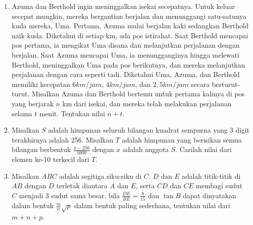 \documentclass{article}
\begin{document}
\begin{enumerate}
		\item
		Azuma dan Berthold ingin meninggalkan isekai secepatnya. Untuk keluar secepat mungkin, mereka bergantian berjalan dan menunggangi satu-satunya kuda mereka, Uma. Pertama, Azuma mulai berjalan kaki sedangkan Berthold naik kuda. Diketahui di setiap km, ada pos istirahat. Saat Berthold mencapai pos pertama, ia mengikat Uma disana dan melanjutkan perjalanan dengan berjalan. Saat Azuma mencapai Uma, ia menungganginya hingga melewati Berthold, meninggalkan Uma pada pos berikutnya, dan mereka melanjutkan perjalanan dengan cara seperti tadi. Diketahui Uma, Azuma, dan Berthold memiliki kecepatan $6 km/jam$, $4 km/jam$, dan $2,5 km/jam$ secara berturut-turut. Misalkan Azuma dan Berthold bertemu untuk pertama kalinya di pos yang berjarak $n$ km dari isekai, dan mereka telah melakukan perjalanan selama $t$ menit. Tentukan nilai $n+t$.
		
		\item
		Misalkan $S$ adalah himpunan seluruh bilangan kuadrat sempurna yang 3 digit terakhirnya adalah 256. Misalkan $T$ adalah himpunan yang berisikan semua bilangan berbentuk $\frac{x-256}{1000}$ dengan $x$ adalah anggota $S$. Carilah nilai dari elemen ke-10 terkecil dari $T$.
		
		\item
		Misalkan $ABC$ adalah segitiga siku-siku di $C$. $D$ dan $E$ adalah titik-titik di $AB$ dengan $D$ terletak diantara $A$ dan $E$, serta $CD$ dan $CE$ membagi sudut $C$ menjadi 3 sudut sama besar. bila $\frac{DE}{BE} = \frac{8}{15}$ dan $\tan B$ dapat dinyatakan dalam bentuk $\frac{m}{n}\sqrt{p}$ dalam bentuk paling sederhana, tentukan nilai dari $m+n+p$.
	\end{enumerate}
\end{document}
